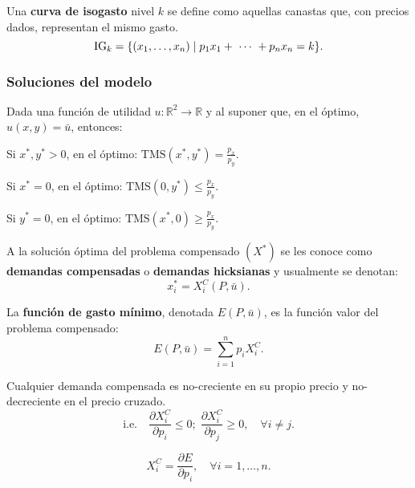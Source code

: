 \documentclass[8pt,a4paper]{extarticle}
\begin{document}
\begin{multicols}{3}
\begin{boxdef}
Una \textbf{curva de isogasto} nivel $k$ se define como aquellas canastas que, con precios dados, representan el mismo gasto. \\
$$\text{\normalfont IG}_k = \{(x_1, \ldots, x_n)  \mid p_1 x_1 +\ \cdots\ + p_n x_n = k\}.$$
\end{boxdef}

\subsubsection*{Soluciones del modelo}

Dada una función de utilidad $u : \mathbb{R}^2 \to \mathbb{R}$ y al suponer que, en el óptimo, $u(x, y) = \bar{u}$, entonces:

\begin{bulletlist}
\item Si $x^*, y^* > 0$, en el óptimo: $\displaystyle \text{TMS} (x^*, y^*) = \frac{p_x}{p_y}$.
\item Si $x^* = 0$, en el óptimo: $\displaystyle \text{TMS} \left(0, y^* \right) \le \frac{p_x}{p_y}$.
\item Si $y^* = 0$, en el óptimo: $\displaystyle \text{TMS} \left(x^*, 0\right) \ge \frac{p_x}{p_y}$.
\end{bulletlist}

\begin{boxdef}
	A la solución óptima del problema compensado $(X^*)$ se les conoce como \textbf{demandas compensadas} o \textbf{demandas hicksianas} y usualmente se denotan:
\[
	x_i^* = X_i^C (P, \bar{u})
.\] 
\end{boxdef}

\begin{boxdef}
	La \textbf{función de gasto mínimo}, denotada $E(P, \bar{u})$, es la función valor del problema compensado:
	\[
		E(P, \bar{u}) = \sum_{i=1}^{n} p_i X_i^C
	.\] 
\end{boxdef}

\begin{boxtheo}
	Cualquier demanda compensada es no-creciente en su propio precio y no-decreciente en el precio cruzado. \\
	$$\text{i.e.} \quad \frac{\partial X_i^C}{\partial p_i} \le 0; \; \frac{\partial X_i^C}{\partial p_j} \ge 0, \quad \forall i \neq j.$$
\end{boxtheo}

\begin{boxlemma}
	\[
	X^C_i = \frac{\partial E}{\partial p_i}, \quad \forall i = 1, \ldots, n
	.\] 
\end{boxlemma}


\end{multicols}
\end{document}
